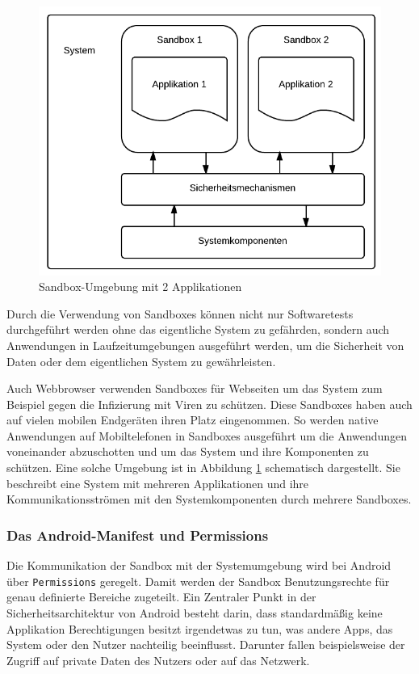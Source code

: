 \begin{figure}[ht!]
\begin{center}
\includegraphics[scale=0.4]{images/sandbox}
\caption{Sandbox-Umgebung mit 2 Applikationen}
\label{sandbox_pic}
\end{center}
\end{figure}

Durch die Verwendung von Sandboxes können nicht nur Softwaretests durchgeführt werden ohne das eigentliche System zu gefährden, sondern auch Anwendungen in Laufzeitumgebungen ausgeführt werden, um die Sicherheit von Daten oder dem eigentlichen System zu gewährleisten. 

Auch Webbrowser verwenden Sandboxes für Webseiten um das System zum Beispiel gegen die Infizierung mit Viren zu schützen. Diese Sandboxes haben auch auf vielen mobilen Endgeräten ihren Platz eingenommen. So werden native Anwendungen auf Mobiltelefonen in Sandboxes ausgeführt um die Anwendungen voneinander abzuschotten und um das System und ihre Komponenten zu schützen. Eine solche Umgebung ist in Abbildung \ref{sandbox_pic} schematisch dargestellt. Sie beschreibt eine System mit mehreren Applikationen und ihre Kommunikationsströmen mit den Systemkomponenten durch mehrere Sandboxes.

\subsubsection{Das Android-Manifest und Permissions}

Die Kommunikation der Sandbox mit der Systemumgebung wird bei Android über \verb+Permissions+ geregelt. Damit werden der Sandbox Benutzungsrechte für genau definierte Bereiche zugeteilt. 
Ein Zentraler Punkt in der Sicherheitsarchitektur von Android besteht darin, dass standardmäßig keine Applikation Berechtigungen besitzt irgendetwas zu tun, was andere Apps, das System oder den Nutzer nachteilig beeinflusst. Darunter fallen beispielsweise der Zugriff auf private Daten des Nutzers oder auf das Netzwerk.


